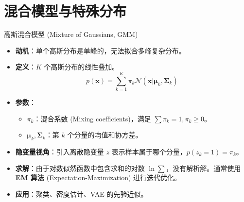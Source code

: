 \documentclass[12pt, aspectratio=169]{beamer}
\newcommand{\vect}[1]{\mathbf{#1}}
\newcommand{\N}{\mathcal{N}}
\begin{document}
\section{混合模型与特殊分布}

\begin{frame}{高斯混合模型 (Mixture of Gaussians, GMM)}
    \begin{itemize}
        \item \textbf{动机}：单个高斯分布是单峰的，无法拟合多峰复杂分布。
        \item \textbf{定义}：$K$ 个高斯分布的线性叠加。
        $$ p(\vect{x}) = \sum_{k=1}^K \pi_k \N(\vect{x}|\boldsymbol{\mu}_k, \boldsymbol{\Sigma}_k) $$
        \item \textbf{参数}：
        \begin{itemize}
            \item $\pi_k$：混合系数 (Mixing coefficients)，满足 $\sum \pi_k = 1, \pi_k \ge 0$。
            \item $\boldsymbol{\mu}_k, \boldsymbol{\Sigma}_k$：第 $k$ 个分量的均值和协方差。
        \end{itemize}
        \item \textbf{隐变量视角}：引入离散隐变量 $z$ 表示样本属于哪个分量，$p(z_k=1)=\pi_k$。
        \item \textbf{求解}：由于对数似然函数中包含求和的对数 $\ln \sum$，没有解析解。通常使用 \textbf{EM 算法} (Expectation-Maximization) 进行迭代优化。
        \item \textbf{应用}：聚类、密度估计、VAE 的先验近似。
    \end{itemize}
\end{frame}
\end{document}
